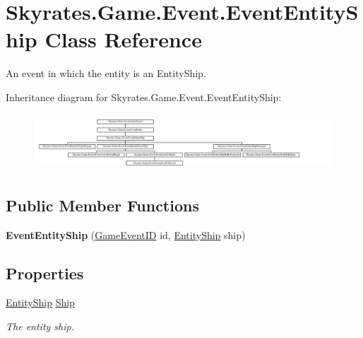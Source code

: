 \hypertarget{class_skyrates_1_1_game_1_1_event_1_1_event_entity_ship}{\section{Skyrates.\-Game.\-Event.\-Event\-Entity\-Ship Class Reference}
\label{class_skyrates_1_1_game_1_1_event_1_1_event_entity_ship}
}


An event in which the entity is an Entity\-Ship.  


Inheritance diagram for Skyrates.\-Game.\-Event.\-Event\-Entity\-Ship\-:\begin{figure}[H]
\begin{center}
\leavevmode
\includegraphics[height=2.126582cm]{class_skyrates_1_1_game_1_1_event_1_1_event_entity_ship}
\end{center}
\end{figure}
\subsection*{Public Member Functions}
\begin{DoxyCompactItemize}
\item 
\hypertarget{class_skyrates_1_1_game_1_1_event_1_1_event_entity_ship_ade20513de7b552c67ebea359cf3f7058}{{\bfseries Event\-Entity\-Ship} (\hyperlink{namespace_skyrates_1_1_game_1_1_event_ad31565d2f03f234f8f77ebf23ff8f150}{Game\-Event\-I\-D} id, \hyperlink{class_skyrates_1_1_entity_1_1_entity_ship}{Entity\-Ship} ship)}\label{class_skyrates_1_1_game_1_1_event_1_1_event_entity_ship_ade20513de7b552c67ebea359cf3f7058}

\end{DoxyCompactItemize}
\subsection*{Properties}
\begin{DoxyCompactItemize}
\item 
\hyperlink{class_skyrates_1_1_entity_1_1_entity_ship}{Entity\-Ship} \hyperlink{class_skyrates_1_1_game_1_1_event_1_1_event_entity_ship_a93b99ed8de4ecf3fd40a46628f48e318}{Ship}
\begin{DoxyCompactList}\small\item\em The entity ship. \end{DoxyCompactList}\end{DoxyCompactItemize}
